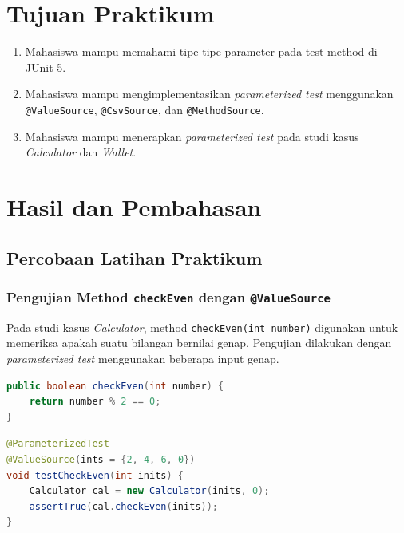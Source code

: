 \documentclass[a4paper,oneside,12pt]{report}
\newcommand{\tocboldsection}[1]{%
  \protect\renewcommand{\protect\cftchapfont}{\protect\bfseries}%
  #1%
  \protect\renewcommand{\protect\cftchapfont}{}%
}
\begin{document}
\chapter[Tujuan Praktikum]{Tujuan Praktikum}
\begin{enumerate}
   \item Mahasiswa mampu memahami tipe-tipe parameter pada test method di JUnit 5.
   \item Mahasiswa mampu mengimplementasikan \textit{parameterized test} menggunakan \texttt{@ValueSource}, \texttt{@CsvSource}, dan \texttt{@MethodSource}.
   \item Mahasiswa mampu menerapkan \textit{parameterized test} pada studi kasus \textit{Calculator} dan \textit{Wallet}.
\end{enumerate}
\clearpage

\chapter[\tocboldsection{Hasil dan Pembahasan}]{Hasil dan Pembahasan}

\section{Percobaan Latihan Praktikum}

\subsection{Pengujian Method \texttt{checkEven} dengan \texttt{@ValueSource}}

Pada studi kasus \textit{Calculator}, method \texttt{checkEven(int number)} digunakan untuk memeriksa apakah suatu bilangan bernilai genap. Pengujian dilakukan dengan \textit{parameterized test} menggunakan beberapa input genap.

\begin{lstlisting}[style=commonstyle,language=Java,caption={Implementasi method checkEven pada class Calculator}]
public boolean checkEven(int number) {
    return number % 2 == 0;
}
\end{lstlisting}

\begin{lstlisting}[style=commonstyle,language=Java,caption={Parameterized test ValueSource untuk checkEven}]
@ParameterizedTest
@ValueSource(ints = {2, 4, 6, 0})
void testCheckEven(int inits) {
    Calculator cal = new Calculator(inits, 0);
    assertTrue(cal.checkEven(inits));
}
\end{lstlisting}
\end{document}
